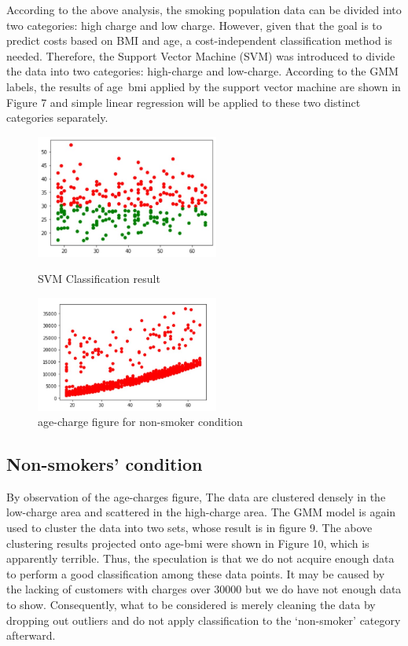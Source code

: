 \documentclass[12pt,a4paper]{article}
\begin{document}
According to the above analysis, the smoking population data can be divided into two categories: high charge and low charge. However, given that the goal is to predict costs based on BMI and age, a cost-independent classification method is needed. Therefore, the Support Vector Machine (SVM) was introduced to divide the data into two categories: high-charge and low-charge. According to the GMM labels, the results of age~bmi applied by the support vector machine are shown in Figure 7 and simple linear regression will be applied to these two distinct categories separately.

\begin{figure}[H]
\centering
\begin{minipage}[t]{0.48\textwidth}
\centering
\includegraphics[width=6cm]{svm.jpg}
\caption{SVM Classification result}
\end{minipage}
\begin{minipage}[t]{0.48\textwidth}
\centering
\includegraphics[width=6cm]{age-chargenonsmoker.jpg}
\caption{age-charge figure for non-smoker condition}
\end{minipage}
\end{figure}

\subsection{Non-smokers' condition}
By observation of the age-charges figure, The data are clustered densely in the low-charge area and scattered in the high-charge area. The GMM model is again used to cluster the data into two sets, whose result is in figure 9. The above clustering results projected onto age-bmi were shown in Figure 10, which is apparently terrible. Thus, the speculation is that we do not acquire enough data to perform a good classification among these data points. It may be caused by the lacking of customers with charges over 30000 but we do have not enough data to show. Consequently, what to be considered is merely cleaning the data by dropping out outliers and do not apply classification to the ‘non-smoker’ category afterward. 
\end{document}
